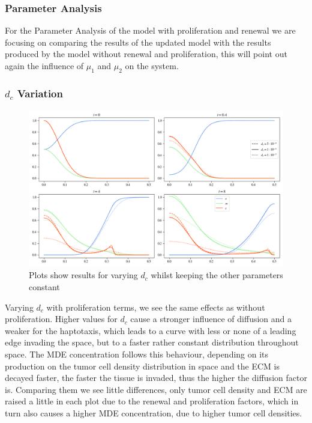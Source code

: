 \subsubsection{Parameter Analysis}

For the Parameter Analysis of the model with proliferation and renewal we are focusing on comparing the results of the updated model with the results produced by the model without renewal and proliferation, this will point out again the influence of $\mu_1$ and $\mu_2$ on the system. 

\subsubsection*{$d_c$ Variation}
\begin{figure}[h]
    \centering
    \includegraphics[width=\textwidth]{resources/images/prolif_dc_variation.png}
    \caption{Plots show results for varying $d_c$ whilst keeping the other parameters constant}
    \label{fig:prolif_dc_comparison}
\end{figure}

Varying $d_c$ with proliferation terms, we see the same effects as without proliferation. Higher values for $d_c$ cause a stronger influence of diffusion and a weaker for the haptotaxis, which leads to a curve with less or none of a leading edge invading the space, but to a faster rather constant distribution throughout space. The MDE concentration follows this behaviour, depending on its production on the tumor cell density distribution in space and the ECM is decayed faster, the faster the tissue is invaded, thus the higher the diffusion factor is. Comparing them we see little differences, only tumor cell density and ECM are raised a little in each plot due to the renewal and proliferation factors, which in turn also causes a higher MDE concentration, due to higher tumor cell densities. 


